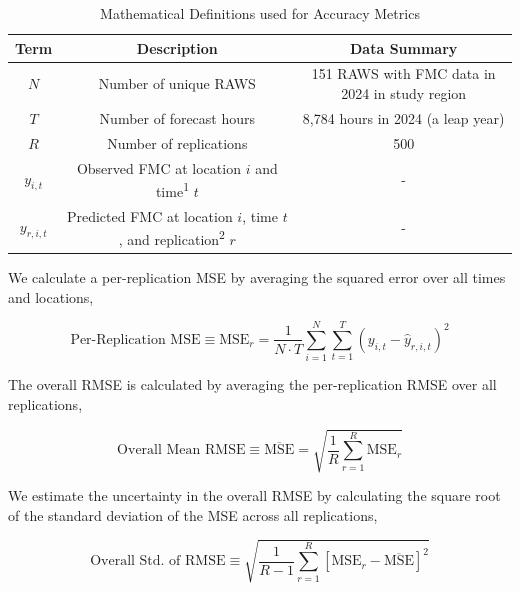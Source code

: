 \documentclass[fire,article,submit,pdftex,moreauthors]{Definitions/mdpi}
\begin{document}
\begin{table}[tbh]
\caption{Mathematical Definitions used for Accuracy Metrics\label{tab:defs}}
\begin{tabularx}{\textwidth}{CCC}
\toprule
\textbf{Term} & \textbf{Description} & \textbf{Data Summary} \\
\midrule
$N$ & Number of unique RAWS & 151 RAWS with FMC data in 2024 in study region \\
\midrule
$T$ & Number of forecast hours & 8,784 hours in 2024 (a leap year)\\
\midrule
$R$ & Number of replications & 500 \\
\midrule
$y_{i,t}$ & Observed FMC at location $i$ and time\textsuperscript{1} $t$ & - \\
\midrule
$y_{r, i, t}$ & Predicted FMC at location $i$, time $t$, and replication\textsuperscript{2} $r$& - \\
\bottomrule
\end{tabularx}
\end{table}
We calculate a per-replication MSE by averaging the squared error over all times and locations,
\begin{linenomath}
\begin{equation}
\label{eq:mser}
    \text{Per-Replication MSE} \equiv \text{MSE}_r = \frac{1}{N\cdot T}\sum_{i=1}^{N} \sum_{t=1}^{T} (y_{i, t} - \hat y_{r, i, t})^2
\end{equation}
\end{linenomath}
The overall RMSE is calculated by averaging the per-replication RMSE over all replications,
\begin{linenomath}
\begin{equation}
\label{eq:mse}
    \text{Overall Mean RMSE} \equiv \overline{\text{MSE}} = \sqrt{\frac{1}{R}\sum_{r=1}^R\text{MSE}_r}
\end{equation}
\end{linenomath}
We estimate the uncertainty in the overall RMSE by calculating the square root of the standard deviation of the MSE across all replications,
\begin{linenomath}
\begin{equation}
\label{eq:mse_std}
    \text{Overall Std. of RMSE} \equiv \sqrt{\frac{1}{R-1} \sum_{r=1}^R\left[\text{MSE}_r - \overline{\text{MSE}}\right]^2}
\end{equation}
\end{linenomath}
\end{document}
